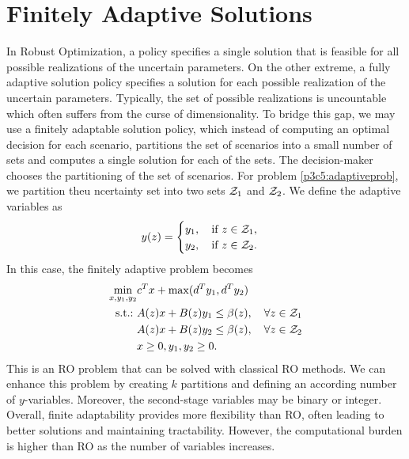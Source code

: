 \section{Finitely Adaptive Solutions}

In Robust Optimization, a policy specifies a single solution that is feasible for all possible realizations of the uncertain parameters. On the other extreme, a fully adaptive solution policy specifies a solution for each possible realization of the uncertain parameters. Typically, the set of possible realizations is uncountable which often suffers from the curse of dimensionality. To bridge this gap, we may use a finitely adaptable solution policy, which instead of computing an optimal decision for each scenario, partitions the set of scenarios into a small number of sets and computes a single solution for each of the sets. The decision-maker chooses the partitioning of the set of scenarios. For problem \ref{p3c5:adaptiveprob}, we partition theu ncertainty set into two sets $\mathcal{Z}_1$ and $\mathcal{Z}_2$. We define the adaptive variables as 
\begin{align*}
y(z) = \begin{cases} y_1,\quad \text{if }z\in\mathcal{Z}_1, \\ y_2,\quad \text{if }z\in\mathcal{Z}_2.\end{cases}
\end{align*} 
In this case, the finitely adaptive problem becomes
\begin{align}\label{p3c5:finadaptiveprob}
\min\limits_{x,y_1,y_2} & c^T x + \max ( d^Ty_1,d^Ty_2) \\
\mathop{\text{s.t.:~}} & A(z)x+ B(z)y_1 \leq \beta(z),\quad\forall z\in\mathcal{Z}_1 \\
& A(z)x+ B(z)y_2 \leq \beta(z),\quad\forall z\in\mathcal{Z}_2 \\
& x\geq 0, y_1,y_2\geq 0.
\end{align}
This is an RO problem that can be solved with classical RO methods. We can enhance this problem by creating $k$ partitions and defining an according number of $y$-variables. Moreover, the second-stage variables may be binary or integer. Overall, finite adaptability provides more flexibility than RO, often leading to better solutions and maintaining tractability. However, the computational burden is higher than RO as the number of variables increases.
